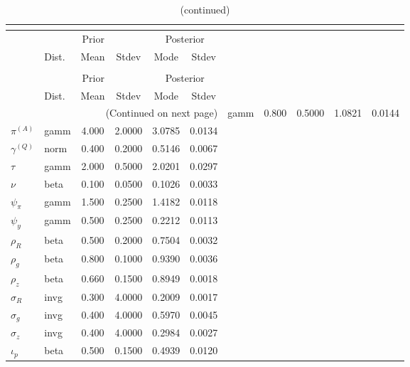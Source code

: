  
\begin{center}
\begin{longtable}{llcccc} 
\caption{Results from posterior maximization (parameters)}\\
 \label{Table:Posterior:1}\\
\toprule 
  & \multicolumn{3}{c}{Prior}  &  \multicolumn{2}{c}{Posterior} \\
  \cmidrule(r{.75em}){2-4} \cmidrule(r{.75em}){5-6}
  & Dist. & Mean  & Stdev & Mode & Stdev \\ 
\midrule \endfirsthead 
\caption{(continued)}\\
 \bottomrule 
  & \multicolumn{3}{c}{Prior}  &  \multicolumn{2}{c}{Posterior} \\
  \cmidrule(r{.75em}){2-4} \cmidrule(r{.75em}){5-6}
  & Dist. & Mean  & Stdev & Mode & Stdev \\ 
\midrule \endhead 
\bottomrule \multicolumn{6}{r}{(Continued on next page)}\endfoot 
\bottomrule\endlastfoot 
${r_{A}}$ & gamm &   0.800 & 0.5000 &   1.0821 &  0.0144 \\ 
${\pi^{(A)}}$ & gamm &   4.000 & 2.0000 &   3.0785 &  0.0134 \\ 
${\gamma^{(Q)}}$ & norm &   0.400 & 0.2000 &   0.5146 &  0.0067 \\ 
${\tau}$ & gamm &   2.000 & 0.5000 &   2.0201 &  0.0297 \\ 
${\nu}$ & beta &   0.100 & 0.0500 &   0.1026 &  0.0033 \\ 
${\psi_\pi}$ & gamm &   1.500 & 0.2500 &   1.4182 &  0.0118 \\ 
${\psi_y}$ & gamm &   0.500 & 0.2500 &   0.2212 &  0.0113 \\ 
${\rho_R}$ & beta &   0.500 & 0.2000 &   0.7504 &  0.0032 \\ 
${\rho_{g}}$ & beta &   0.800 & 0.1000 &   0.9390 &  0.0036 \\ 
${\rho_z}$ & beta &   0.660 & 0.1500 &   0.8949 &  0.0018 \\ 
${\sigma_R}$ & invg &   0.300 & 4.0000 &   0.2009 &  0.0017 \\ 
${\sigma_{g}}$ & invg &   0.400 & 4.0000 &   0.5970 &  0.0045 \\ 
${\sigma_z}$ & invg &   0.400 & 4.0000 &   0.2984 &  0.0027 \\ 
${\iota_p}$ & beta &   0.500 & 0.1500 &   0.4939 &  0.0120 \\ 
\end{longtable}
 \end{center}
